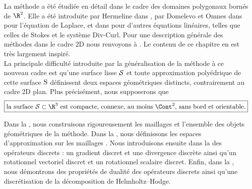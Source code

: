 La méthode \ddfv a été étudiée en détail dans le cadre des domaines polygonaux bornés de $\R^2$. Elle a été introduite par Hermeline dans \cite{hermeline_finite_2000}, par Domelevo et Omnes dans \cite{domelevo_finite_2005} pour l'équation de Laplace, et dans \cite{delcourte_discrete-duality_2005} pour d'autres équations linéaires, telles que celles de Stokes et le système Div-Curl. Pour une description générale des méthodes \ddfv dans le cadre 2D nous renvoyons à \cite[Chapitre I]{krell_schemas_2010}. Le contenu de ce chapitre en est très largement inspiré. \\

La principale difficulté introduite par la généralisation de la méthode \ddfv à ce nouveau cadre est qu'une surface lisse $\mathcal{S}$ et toute approximation polyédrique de cette surface $\mathrm{S}$ définissent deux espaces géométriques distincts, contrairement au cadre 2D plan. Plus précisément, nous supposerons que 
\[
\boxed{\text{la surface $\surflisse \subset \R^3$ est compacte, connexe, au moins $\Cont^2$, sans bord et orientable.}}
\]

Dans la , nous construisons rigoureusement les maillages \ddfv et l'ensemble des objets géométriques de la méthode. Dans la , nous définissons les espaces d'approximation sur les maillages \ddfv. Nous introduisons ensuite dans la  des opérateurs discrets : un gradient discret et une divergence discrète ainsi qu’un rotationnel vectoriel discret et un rotationnel scalaire discret. Enfin, dans la , nous démontrons des propriétés de dualité des opérateurs discrets ainsi qu'une discrétisation de la décomposition de Helmholtz--Hodge. 






